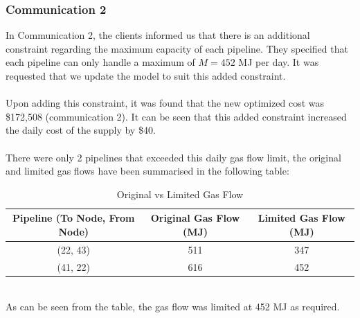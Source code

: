 \documentclass{article}
\begin{document}
\subsubsection{Communication 2}
In Communication 2, the clients informed us that there is an additional constraint regarding the maximum capacity of each pipeline. They specified that each pipeline can only handle a maximum of \(M = 452\) MJ per day. It was requested that we update the model to suit this added constraint. \\
\\
Upon adding this constraint, it was found that the new optimized cost was \$172,508 (communication 2). It can be seen that this added constraint increased the daily cost of the supply by \$40.\\
\\
There were only 2 pipelines that exceeded this daily gas flow limit, the original and limited gas flows have been summarised in the following table:\\
\renewcommand\baselinestretch{1.5}
\begin{table}[h]
    \centering
    \color{black}
    \begin{tabular}{|c:c:c|}
        \hline
        \textbf{Pipeline} (To Node, From Node) & \textbf{Original Gas Flow} (MJ) & \textbf{Limited Gas Flow} (MJ)\\
        \hline
        (22, 43) & 511 & 347\\ \hdashline
        (41, 22) & 616 & 452\\ 
        \hline
    \end{tabular}
    \caption{Original vs Limited Gas Flow}
    \label{tab:gasflow}
\end{table}
\renewcommand\baselinestretch{1}
\\
As can be seen from the table, the gas flow was limited at 452 MJ as required.
\newpage
\bigskip
\end{document}
